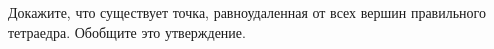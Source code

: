 Докажите, что существует точка, равноудаленная от всех вершин правильного тетраедра. Обобщите это утверждение.
